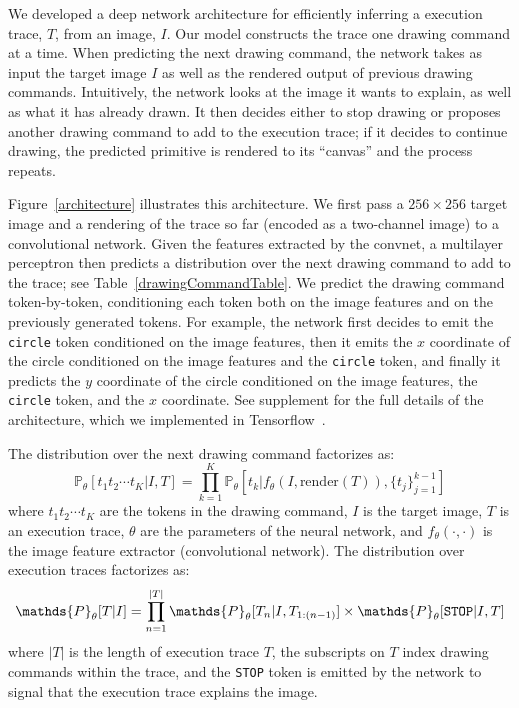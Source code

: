 \documentclass{article}
\newcommand{\probability}{\mathds{P}} %
\newcommand{\remark}[1]{\textcolor{red}{[#1]}}
\begin{document}
We developed a deep network architecture for efficiently inferring a
execution trace, $T$, from an image, $I$.  Our model constructs the
trace one drawing command at a time.  When predicting the next drawing
command, the network takes as input the target image $I$ as well as
the rendered output of previous drawing commands.  Intuitively, the
network looks at the image it wants to explain, as well as what it has
already drawn.  It then decides either to stop drawing or proposes
another drawing command to add to the execution trace; if it decides
to continue drawing, the predicted primitive is rendered to its
``canvas'' and the process repeats.

Figure~\ref{architecture} illustrates this architecture.  We first
pass a $256\times 256$ target image and a rendering of the trace so
far (encoded as a two-channel image) to a convolutional network. Given the features extracted by the
convnet, a multilayer perceptron then predicts a distribution over the
next drawing command to add to the trace; see Table~\ref{drawingCommandTable}.  We predict the drawing
command token-by-token, conditioning each token both on the image
features and on the previously generated tokens.  For example, the
network first decides to emit the \verb|circle| token conditioned on
the image features, then it emits the $x$ coordinate of the circle
conditioned on the image features and the \verb|circle| token, and
finally it predicts the $y$ coordinate of the circle conditioned on
the image features, the \verb|circle| token, and the $x$ coordinate.
See supplement for the full details of the architecture,
which we implemented in Tensorflow~\cite{tensorflow2015-whitepaper}.

The distribution over the next drawing command factorizes as:
\begin{equation}
  \probability_\theta [t_1t_2\cdots t_K | I,T] = \prod_{k = 1}^K \probability_\theta [t_k | f_\theta(I,\text{render}(T)), \{t_j\}_{j = 1}^{k - 1}]
\end{equation}
where $t_1t_2\cdots t_K$ are the tokens in the drawing command, $I$ is
the target image, $T$ is an execution trace, $\theta$ are the
parameters of the neural network, and $f_\theta(\cdot,\cdot)$ is the
image feature extractor (convolutional network). The distribution over
execution traces factorizes as:
\begin{equation}
  \probability_\theta [T|I] = \prod_{n = 1}^{|T|} \probability_\theta [T_n | I,T_{1:(n-1)}]\times\probability_\theta [\verb|STOP| | I,T]\label{objective}
\end{equation}
where $|T|$ is the length of execution trace $T$, the subscripts
on $T$ index drawing commands within the trace, and the \verb|STOP|
token is emitted by the network to signal that the execution trace
explains the image.
\end{document}
